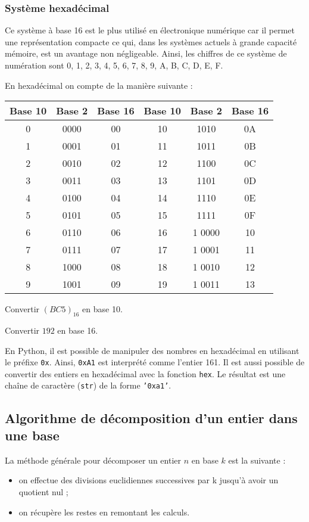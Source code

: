 \subsubsection{Système hexadécimal}
Ce système à base 16 est le plus utilisé en électronique numérique car il permet une représentation compacte ce qui, dans les systèmes actuels à grande capacité mémoire, est un avantage non négligeable. 
Ainsi, les chiffres de ce système de numération sont 0, 1, 2, 3, 4, 5, 6, 7, 8, 9, A, B, C, D, E, F.  

\begin{exemple}
En hexadécimal on compte de la manière suivante : 
\begin{center}
\footnotesize
\begin{tabular}{|c|c|c||c|c|c|}
\hline
Base 10 & Base 2 & Base 16 & Base 10 & Base 2 & Base 16 \\
\hline \hline
0 & 0000 & 00 & 10 & 1010 & 0A \\ \hline
1 & 0001& 01 & 11  & 1011 & 0B \\ \hline
2 & 0010& 02 & 12  & 1100 & 0C \\ \hline
3 & 0011& 03 & 13  & 1101 & 0D \\ \hline
4 & 0100& 04 & 14  & 1110 & 0E \\ \hline
5 & 0101& 05 & 15  & 1111 & 0F \\ \hline
6 & 0110& 06 & 16  & 1 0000 & 10\\ \hline
7 & 0111& 07 & 17  & 1 0001 & 11 \\ \hline
8 & 1000& 08 & 18  & 1 0010 & 12 \\ \hline
9 & 1001& 09 & 19  & 1 0011 & 13 \\ \hline
\end{tabular}
\normalsize
\end{center}


Convertir $\left(BC5 \right)_{16}$ en base 10.

Convertir $192$ en base 16.

\end{exemple}


En Python, il est possible de manipuler des nombres en hexadécimal en utilisant le préfixe \texttt{0x}. Ainsi, \texttt{0xA1} est interprété comme l'entier 161. 
Il est aussi possible de convertir des entiers en hexadécimal avec la fonction \texttt{hex}. Le résultat est une chaîne de caractère (\texttt{str}) de la forme \texttt{'0xa1'}.


\subsection{Algorithme de décomposition d'un entier dans une base}
\begin{methode}
La méthode générale pour décomposer un entier $n$ en base $k$ est la suivante :
\begin{itemize}
\item on effectue des divisions euclidiennes successives par k jusqu’à avoir un quotient nul ;
\item on récupère les restes en remontant les calculs.
\end{itemize}
\end{methode}

